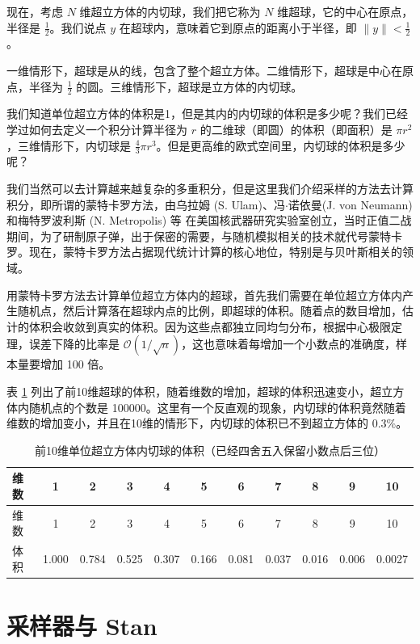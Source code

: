 \documentclass[12pt,a4paper,UTF8,twoside]{book}
\theoremstyle{definition}
\theoremstyle{definition}
\theoremstyle{definition}
\theoremstyle{remark}
\begin{document}
现在，考虑 \(N\) 维超立方体的内切球，我们把它称为 \(N\)
维超球，它的中心在原点，半径是 \(\frac{1}{2}\)。我们说点 \(y\)
在超球内，意味着它到原点的距离小于半径，即 \(\| y \| < \frac{1}{2}\)。

一维情形下，超球是从的线，包含了整个超立方体。二维情形下，超球是中心在原点，半径为
\(\frac{1}{2}\) 的圆。三维情形下，超球是立方体的内切球。

我们知道单位超立方体的体积是1，但是其内的内切球的体积是多少呢？我们已经学过如何去定义一个积分计算半径为
\(r\) 的二维球（即圆）的体积（即面积）是
\(\pi r^2\)，三维情形下，内切球是
\(\frac{4}{3}\pi r^3\)。但是更高维的欧式空间里，内切球的体积是多少呢？

我们当然可以去计算越来越复杂的多重积分，但是这里我们介绍采样的方法去计算积分，即所谓的蒙特卡罗方法，由乌拉姆
(S. Ulam)、冯\(\cdot\)诺依曼(J. von Neumann) 和梅特罗波利斯 (N.
Metropolis) 等
在美国核武器研究实验室创立，当时正值二战期间，为了研制原子弹，出于保密的需要，与随机模拟相关的技术就代号蒙特卡罗。现在，蒙特卡罗方法占据现代统计计算的核心地位，特别是与贝叶斯相关的领域。

用蒙特卡罗方法去计算单位超立方体内的超球，首先我们需要在单位超立方体内产生随机点，然后计算落在超球内点的比例，即超球的体积。随着点的数目增加，估计的体积会收敛到真实的体积。因为这些点都独立同均匀分布，根据中心极限定理，误差下降的比率是
\(\mathcal{O}\left( 1 / \sqrt{n} \right)\)，这也意味着每增加一个小数点的准确度，样本量要增加
100 倍。

表 \ref{tab:calculate-volume-of-hyperball}
列出了前10维超球的体积，随着维数的增加，超球的体积迅速变小，超立方体内随机点的个数是
100000。这里有一个反直观的现象，内切球的体积竟然随着维数的增加变小，并且在10维的情形下，内切球的体积已不到超立方体的
0.3\%。

\begin{longtable}[]{@{}lcccccccccc@{}}
\caption{\label{tab:calculate-volume-of-hyperball}
前10维单位超立方体内切球的体积（已经四舍五入保留小数点后三位）}\tabularnewline
\toprule
维数 & 1 & 2 & 3 & 4 & 5 & 6 & 7 & 8 & 9 & 10\tabularnewline
\midrule
\endfirsthead
\toprule
维数 & 1 & 2 & 3 & 4 & 5 & 6 & 7 & 8 & 9 & 10\tabularnewline
\midrule
\endhead
体积 & 1.000 & 0.784 & 0.525 & 0.307 & 0.166 & 0.081 & 0.037 & 0.016 &
0.006 & 0.0027\tabularnewline
\bottomrule
\end{longtable}

\hypertarget{Samplers}{%
\section{采样器与 Stan}\label{Samplers}}
\end{document}
